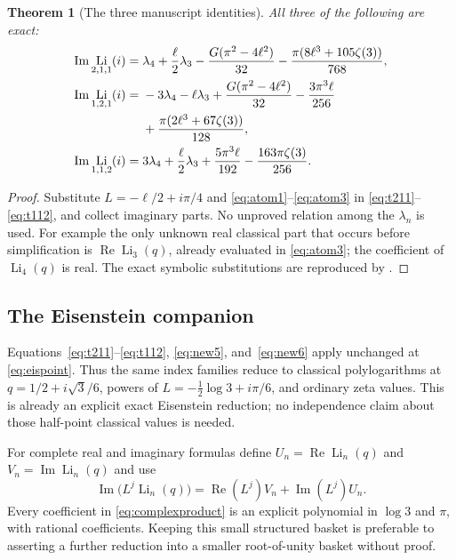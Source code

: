 \documentclass[11pt]{article}
\numberwithin{equation}{section}
\newtheorem{theorem}{Theorem}[section]
\theoremstyle{definition}\newtheorem{definition}[theorem]{Definition}
\theoremstyle{remark}\newtheorem{remark}[theorem]{Remark}
\DeclareMathOperator{\Li}{Li}
\DeclareMathOperator{\Rea}{Re}
\DeclareMathOperator{\Ima}{Im}
\newcommand{\code}[1]{\texttt{\detokenize{#1}}}
\begin{document}
\begin{theorem}[The three manuscript identities]\label{thm:gaussian}
All three of the following are exact:
\begin{align}
\Ima\Li_{2,1,1}(i)
={}&\lambda_4+\frac\ell2\lambda_3
-\frac{G(\pi^2-4\ell^2)}{32}
-\frac{\pi(8\ell^3+105\zeta(3))}{768},\label{eq:g211}\\
\Ima\Li_{1,2,1}(i)
={}&-3\lambda_4-\ell\lambda_3
+\frac{G(\pi^2-4\ell^2)}{32}
-\frac{3\pi^3\ell}{256}\notag\\
&+\frac{\pi(2\ell^3+67\zeta(3))}{128},\label{eq:g121}\\
\Ima\Li_{1,1,2}(i)
={}&3\lambda_4+\frac\ell2\lambda_3
+\frac{5\pi^3\ell}{192}-\frac{163\pi\zeta(3)}{256}.
\label{eq:g112}
\end{align}
\end{theorem}
\begin{proof}
Substitute $L=-\ell/2+i\pi/4$ and
\eqref{eq:atom1}--\eqref{eq:atom3} in
\eqref{eq:t211}--\eqref{eq:t112}, and collect imaginary parts.
No unproved relation among the $\lambda_n$ is used.
For example the only unknown real classical part that occurs before
simplification is $\Rea\Li_3(q)$, already evaluated in
\eqref{eq:atom3}; the coefficient of $\Li_4(q)$ is real.
The exact symbolic substitutions are reproduced by
\code{code/check_exact.py}.
\end{proof}

\subsection{The Eisenstein companion}
Equations~\eqref{eq:t211}--\eqref{eq:t112},
\eqref{eq:new5}, and~\eqref{eq:new6} apply unchanged at
\eqref{eq:eispoint}. Thus the same index families reduce to classical
polylogarithms at $q=1/2+i\sqrt3/6$, powers of
$L=-\tfrac12\log3+i\pi/6$, and ordinary zeta values.
This is already an explicit exact Eisenstein reduction; no independence
claim about those half-point classical values is needed.

For complete real and imaginary formulas define
$U_n=\Rea\Li_n(q)$ and $V_n=\Ima\Li_n(q)$ and use
\begin{equation}\label{eq:complexproduct}
\Ima\bigl(L^j\Li_n(q)\bigr)
=\Rea(L^j)V_n+\Ima(L^j)U_n.
\end{equation}
Every coefficient in \eqref{eq:complexproduct} is an explicit polynomial
in $\log3$ and $\pi$, with rational coefficients.
Keeping this small structured basket is preferable to asserting a
further reduction into a smaller root-of-unity basket without proof.
\end{document}
